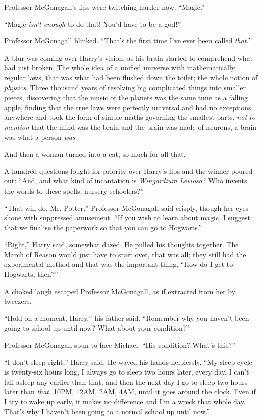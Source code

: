 Professor McGonagall's lips were twitching harder now. ``Magic.''

``Magic \emph{isn't enough} to do that! You'd have to be a god!''

Professor McGonagall blinked. ``That's the first time I've ever been called \emph{that.}''

A blur was coming over Harry's vision, as his brain started to comprehend what had just broken. The whole idea of a unified universe with mathematically regular laws, that was what had been flushed down the toilet; the whole notion of \emph{physics}. Three thousand years of resolving big complicated things into smaller pieces, discovering that the music of the planets was the same tune as a falling apple, finding that the true laws were perfectly universal and had no exceptions anywhere and took the form of simple maths governing the smallest parts, \emph{not to mention} that the mind was the brain and the brain was made of neurons, a brain was what a person \emph{was} -

And then a woman turned into a cat, so much for all that.

A hundred questions fought for priority over Harry's lips and the winner poured out: ``And, and what kind of incantation is \emph{Wingardium Leviosa?} Who invents the words to these spells, nursery schoolers?''

``That will do, Mr. Potter,'' Professor McGonagall said crisply, though her eyes shone with suppressed amusement. ``If you wish to learn about magic, I suggest that we finalise the paperwork so that you can go to Hogwarts.''

``Right,'' Harry said, somewhat dazed. He pulled his thoughts together. The March of Reason would just have to start over, that was all; they still had the experimental method and that was the important thing. ``How do I get to Hogwarts, then?''

A choked laugh escaped Professor McGonagall, as if extracted from her by tweezers.

``Hold on a moment, Harry,'' his father said. ``Remember why you haven't been going to school up until now? What about your condition?''

Professor McGonagall spun to face Michael. ``His condition? What's this?''

``I don't sleep right,'' Harry said. He waved his hands helplessly. ``My sleep cycle is twenty-six hours long, I always go to sleep two hours later, every day. I can't fall asleep any earlier than that, and then the next day I go to sleep two hours later than \emph{that.} 10PM, 12AM, 2AM, 4AM, until it goes around the clock. Even if I try to wake up early, it makes no difference and I'm a wreck that whole day. That's why I haven't been going to a normal school up until now.''


